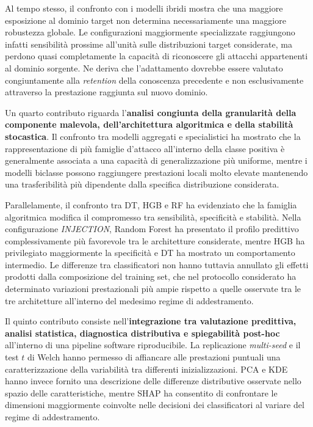 Al tempo stesso, il confronto con i modelli ibridi mostra che una maggiore esposizione al dominio target non determina necessariamente una maggiore robustezza globale.
Le configurazioni maggiormente specializzate raggiungono infatti sensibilità prossime all'unità sulle distribuzioni target considerate, ma perdono quasi completamente la capacità di riconoscere gli attacchi appartenenti al dominio sorgente.
Ne deriva che l'adattamento dovrebbe essere valutato congiuntamente alla \textit{retention} della conoscenza precedente e non esclusivamente attraverso la prestazione raggiunta sul nuovo dominio.

Un quarto contributo riguarda l'\textbf{analisi congiunta della granularità della componente malevola, dell'architettura algoritmica e della stabilità stocastica}.
Il confronto tra modelli aggregati e specialistici ha mostrato che la rappresentazione di più famiglie d'attacco all'interno della classe positiva è generalmente associata a una capacità di generalizzazione più uniforme, mentre i modelli biclasse possono raggiungere prestazioni locali molto elevate mantenendo una trasferibilità più dipendente dalla specifica distribuzione considerata.

Parallelamente, il confronto tra DT, HGB e RF ha evidenziato che la famiglia algoritmica modifica il compromesso tra sensibilità, specificità e stabilità.
Nella configurazione \textit{INJECTION}, Random Forest ha presentato il profilo predittivo complessivamente più favorevole tra le architetture considerate, mentre HGB ha privilegiato maggiormente la specificità e DT ha mostrato un comportamento intermedio.
Le differenze tra classificatori non hanno tuttavia annullato gli effetti prodotti dalla composizione del training set, che nel protocollo considerato ha determinato variazioni prestazionali più ampie rispetto a quelle osservate tra le tre architetture all'interno del medesimo regime di addestramento.

Il quinto contributo consiste nell'\textbf{integrazione tra valutazione predittiva, analisi statistica, diagnostica distributiva e spiegabilità post-hoc} all'interno di una pipeline software riproducibile.
La replicazione \textit{multi-seed} e il test $t$ di Welch hanno permesso di affiancare alle prestazioni puntuali una caratterizzazione della variabilità tra differenti inizializzazioni.
PCA e KDE hanno invece fornito una descrizione delle differenze distributive osservate nello spazio delle caratteristiche, mentre SHAP ha consentito di confrontare le dimensioni maggiormente coinvolte nelle decisioni dei classificatori al variare del regime di addestramento.

